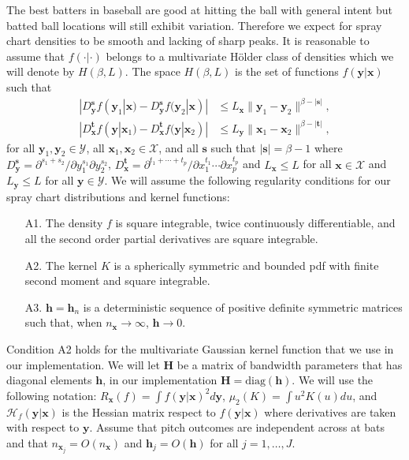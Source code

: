 \documentclass[11pt]{article}
\newcommand{\Y}{\mathcal{Y}}
\newcommand{\X}{\mathcal{X}}
\newcommand{\Hcal}{\mathcal{H}}
\newcommand{\Hbf}{\textbf{H}}
\newcommand{\y}{\textbf{y}}
\newcommand{\x}{\textbf{x}}
\newcommand{\h}{\textbf{h}}
\newcommand{\s}{\textbf{s}}
\newcommand{\tbf}{\textbf{t}}
\DeclareMathOperator{\E}{E}
\DeclareMathOperator{\Var}{Var}
\begin{document}
The best batters in baseball are good at hitting the ball with general intent but batted ball locations will still exhibit variation. Therefore we expect for spray chart densities to be smooth and lacking of sharp peaks. It is reasonable to assume that $f(\cdot|\cdot)$ belongs to a multivariate H{\"o}lder class of densities which we will denote by $H(\beta,L)$. The space $H(\beta,L)$ is the set of functions $f(\y|\x)$ such that 
\begin{align*}
|D_{\y}^\s f(\y_1|\x) - D_{\y}^\s f(\y_2|\x)| &\leq L_\x\|\y_1 - \y_2\|^{\beta - |\s|}, \\
|D_{\x}^\tbf f(\y|\x_1) - D_{\x}^\tbf f(\y|\x_2)| &\leq L_\y\|\x_1 - \x_2\|^{\beta - |\tbf|}, 
\end{align*}
for all $\y_1,\y_2 \in \Y$, all $\x_1,\x_2 \in \X$, and all $\s$ such that $|\s| = \beta - 1$ where
$D_{\y}^\s = \partial^{s_1 + s_2}/\partial y_1^{s_1} \partial y_2^{s_2}$, 
$D_{\x}^\tbf = \partial^{t_1 + \cdots + t_p}/\partial x_1^{t_1} \cdots \partial x_p^{t_p}$ and $L_\x \leq L$ for all $\x \in \X$ and $L_\y \leq L$ for all $\y \in \Y$.
We will assume the following regularity conditions for our spray chart distributions and kernel functions: 

\begin{itemize}
\item[A1.] The density $f$ is square integrable, twice continuously differentiable, and all the second order partial derivatives are square integrable.
\item[A2.] The kernel $K$ is a spherically symmetric and bounded pdf with finite second moment and square integrable.
\item[A3.] $\h = \h_n$ is a deterministic sequence of positive definite symmetric matrices such that, when $n_\x \to \infty$, $\h \to 0$. %
\end{itemize}

Condition A2 holds for the multivariate Gaussian kernel function that we use in our implementation.
We will let $\Hbf$ be a matrix of bandwidth parameters that has diagonal elements $\h$, in our implementation $\Hbf = \text{diag}(\h)$. We will use the following notation: $R_{\x}(f) = \int f(\y|\x)^2 d\y$, $\mu_2(K) = \int u^2K(u)du$, and $\Hcal_f(\y|\x)$ is the Hessian matrix respect to $f(\y|\x)$ where derivatives are taken with respect to $\y$. Assume that pitch outcomes are independent across at bats and that $n_{\x_j} = O(n_\x)$ and $\h_j = O(\h)$ for all $j = 1,\ldots,J$. 
\end{document}
